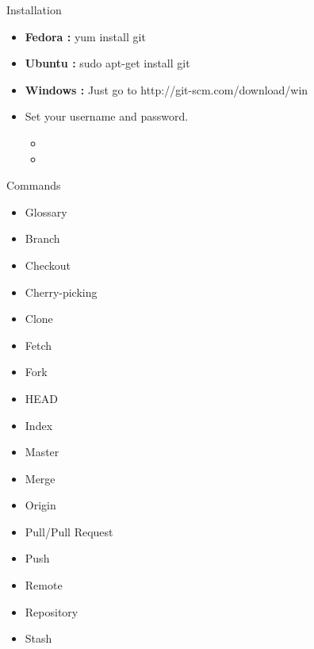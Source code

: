\documentclass[xcolor=x11names,compress]{beamer}
\renewcommand{\(}{\begin{columns}}
\renewcommand{\)}{\end{columns}}
\newcommand{\<}[1]{\begin{column}{#1}}
\renewcommand{\>}{\end{column}}
\begin{document}
%		
\begin{frame}{Installation}
	\begin{itemize}
		\item 	\textbf{Fedora :} yum install git 
		\item \textbf{Ubuntu :} sudo apt-get install git
		\item \textbf{Windows :} Just go to http://git-scm.com/download/win
		\item Set your username and password.
		\begin{itemize}
		\item {}
		\item {}
	\end{itemize}
	\end{itemize}
\end{frame}
\begin{frame}{Commands}
	\begin{itemize}
		\item Glossary
		\item Branch
		\item Checkout
		\item Cherry-picking
		\item Clone
		\item Fetch
		\item Fork
		\item HEAD
		\item Index
		\item Master
		\item Merge
		\item Origin
		\item Pull/Pull Request
		\item Push
		\item Remote
		\item Repository
		\item Stash
		\end{itemize}
\end{frame}
\end{document}
